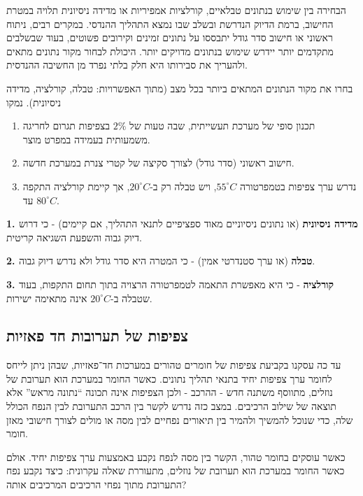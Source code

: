 \documentclass[
  hebrew,
  letterpaper,
  DIV=11,
  numbers=noendperiod]{scrreprt}
\begin{document}
הבחירה בין שימוש בנתונים טבלאיים, קורלציות אמפיריות או מדידה ניסיונית
תלויה במטרת החישוב, ברמת הדיוק הנדרשת ובשלב שבו נמצא התהליך ההנדסי.
במקרים רבים, ניתוח ראשוני או חישוב סדר גודל יתבססו על נתונים זמינים
וקירובים פשוטים, בעוד שבשלבים מתקדמים יותר יידרש שימוש בנתונים מדויקים
יותר. היכולת לבחור מקור נתונים מתאים ולהעריך את סבירותו היא חלק בלתי
נפרד מן החשיבה ההנדסית.

בחרו את מקור הנתונים המתאים ביותר בכל מצב (מתוך האפשרויות: טבלה,
קורלציה, מדידה ניסיונית). נמקו

\begin{enumerate}
\def\labelenumi{\arabic{enumi}.}
\item
  תכנון סופי של מערכת תעשייתית, שבה טעות של \(2\%\) בצפיפות תגרום לחריגה
  משמעותית בעמידה במפרט מוצר.
\item
  חישוב ראשוני (סדר גודל) לצורך סקיצה של קטרי צנרת במערכת חדשה.
\item
  נדרש ערך צפיפות בטמפרטורה \(55^{\circ}C\), ויש טבלה רק
  ב-\(20^{\circ}C\), אך קיימת קורלציה התקפה עד \(80^{\circ}C\).
\end{enumerate}

\textbf{1. מדידה ניסיונית} (או נתונים ניסיוניים מאוד ספציפיים לתנאי
התהליך, אם קיימים) - כי דרוש דיוק גבוה והשפעת השגיאה קריטית.

\textbf{2. טבלה} (או ערך סטנדרטי אמין) - כי המטרה היא סדר גודל ולא נדרש
דיוק גבוה.

\textbf{3. קורלציה} - כי היא מאפשרת התאמה לטמפרטורה הרצויה בתוך תחום
התקפות, בעוד שטבלה ב-\(20^{\circ}C\) אינה מתאימה ישירות.

\subsection{צפיפות של תערובות חד
פאזיות}\label{ux5e6ux5e4ux5d9ux5e4ux5d5ux5ea-ux5e9ux5dc-ux5eaux5e2ux5e8ux5d5ux5d1ux5d5ux5ea-ux5d7ux5d3-ux5e4ux5d0ux5d6ux5d9ux5d5ux5ea}

עד כה עסקנו בקביעת צפיפות של חומרים טהורים במערכות חד־פאזיות, שבהן ניתן
לייחס לחומר ערך צפיפות יחיד בתנאי תהליך נתונים. כאשר החומר במערכת הוא
תערובת של נוזלים, מתווסף משתנה חדש - ההרכב - ולכן הצפיפות אינה תכונה
``נתונה מראש'' אלא תוצאה של שילוב הרכיבים. במצב כזה נדרש לקשר בין הרכב
התערובת לבין הנפח הכולל שלה, כדי שנוכל להמשיך ולהמיר בין תיאורים נפחיים
לבין מסה או מולים לצורך חישובי מאזן חומר.

כאשר עוסקים בחומר טהור, הקשר בין מסה לנפח נקבע באמצעות ערך צפיפות יחיד.
אולם כאשר החומר במערכת הוא תערובת של נוזלים, מתעוררת שאלה עקרונית: כיצד
נקבע נפח התערובת מתוך נפחי הרכיבים המרכיבים אותה?
\end{document}
